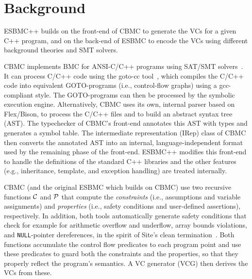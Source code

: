 \documentclass[a4paper]{llncs}
\begin{document}
\section{Background}

ESBMC++ builds on the front-end of CBMC to generate the VCs for a given C++ program,
and on the back-end of ESBMC to encode the VCs using different background theories
and SMT solvers.

\smallskip{}
\label{sec:C-Bounded-Model-Checker}
%
CBMC implements BMC for ANSI-C/C++ programs using SAT/SMT
solvers~\cite{Clarke04}.  It can process C/C++ code using the goto-cc
tool~\cite{Wintersteiger09}, which compiles the C/C++ code into
equivalent GOTO-programs (i.e., control-flow graphs) using a
gcc-compliant style. The GOTO-programs can then be processed by the
symbolic execution engine. Alternatively, CBMC uses its own, internal
parser based on Flex/Bison, to process the C/C++ files and to build an
abstract syntax tree (AST). The typechecker of CBMC's front-end
annotates this AST with types and generates a symbol table. The intermediate
representation (IRep) class of CBMC then converts the annotated AST into an internal,
language-independent format used by the remaining phase of the
front-end.  ESBMC++ modifies this front-end to handle the definitions of
the standard C++ libraries and the other features (e.g., inheritance,
template, and exception handling) are treated internally.

CBMC (and the original ESBMC which builds on CBMC) use two recursive functions
$\cal C$ and $\cal P$ that compute the \emph{constraints}
(i.e., assumptions and variable assignments) and
\emph{properties} (i.e., safety conditions and user-defined
assertions), respectively. In addition, both tools automatically generate safety conditions
that check for example for arithmetic overflow and underflow, array bounds
violations, and \verb|NULL|-pointer dereferences, in the spirit of Site's clean
termination~\cite{Sites74}. Both functions accumulate the control flow
predicates to each program point and use these predicates to guard both
the constraints and the properties, so that they properly reflect the
program's semantics. A VC generator (VCG) then derives the VCs from
these.
\end{document}
